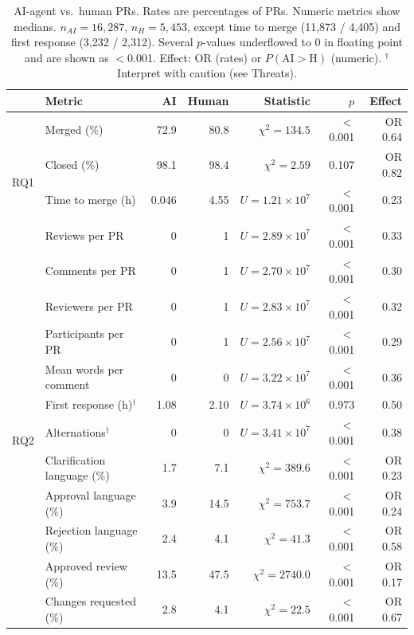 \documentclass[conference]{IEEEtran}
\begin{document}
\begin{table}[t]
\caption{AI-agent vs.\ human PRs. Rates are percentages of PRs. Numeric metrics show medians. $n_{AI}{=}16{,}287$, $n_H{=}5{,}453$, except time to merge (11{,}873 / 4{,}405) and first response (3{,}232 / 2{,}312). Several $p$-values underflowed to 0 in floating point and are shown as $<$0.001. Effect: OR (rates) or $P(\mathrm{AI}{>}\mathrm{H})$ (numeric). $^\dagger$ Interpret with caution (see Threats).}
\label{tab:results}
\centering\small
\begin{tabular}{@{}llrrrrr@{}}
\toprule
 & Metric & AI & Human & Statistic & $p$ & Effect \\
\midrule
\multirow{4}{*}{RQ1} & Merged (\%) & 72.9 & 80.8 & $\chi^2=134.5$ & $<$0.001 & OR 0.64 \\
 & Closed (\%) & 98.1 & 98.4 & $\chi^2=2.59$ & 0.107 & OR 0.82 \\
 & Time to merge (h) & 0.046 & 4.55 & $U=1.21{\times}10^{7}$ & $<$0.001 & 0.23 \\
 & Reviews per PR & 0 & 1 & $U=2.89{\times}10^{7}$ & $<$0.001 & 0.33 \\
\midrule
\multirow{11}{*}{RQ2} & Comments per PR & 0 & 1 & $U=2.70{\times}10^{7}$ & $<$0.001 & 0.30 \\
 & Reviewers per PR & 0 & 1 & $U=2.83{\times}10^{7}$ & $<$0.001 & 0.32 \\
 & Participants per PR & 0 & 1 & $U=2.56{\times}10^{7}$ & $<$0.001 & 0.29 \\
 & Mean words per comment & 0 & 0 & $U=3.22{\times}10^{7}$ & $<$0.001 & 0.36 \\
 & First response (h)$^\dagger$ & 1.08 & 2.10 & $U=3.74{\times}10^{6}$ & 0.973 & 0.50 \\
 & Alternations$^\dagger$ & 0 & 0 & $U=3.41{\times}10^{7}$ & $<$0.001 & 0.38 \\
 & Clarification language (\%) & 1.7 & 7.1 & $\chi^2=389.6$ & $<$0.001 & OR 0.23 \\
 & Approval language (\%) & 3.9 & 14.5 & $\chi^2=753.7$ & $<$0.001 & OR 0.24 \\
 & Rejection language (\%) & 2.4 & 4.1 & $\chi^2=41.3$ & $<$0.001 & OR 0.58 \\
 & Approved review (\%) & 13.5 & 47.5 & $\chi^2=2740.0$ & $<$0.001 & OR 0.17 \\
 & Changes requested (\%) & 2.8 & 4.1 & $\chi^2=22.5$ & $<$0.001 & OR 0.67 \\
\bottomrule
\end{tabular}
\end{table}
\end{document}
